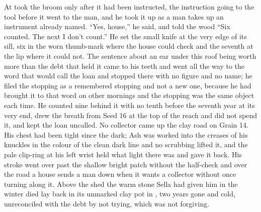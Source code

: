 At   took the broom only after it had been instructed, the instruction going to the tool before it went to the man, and he took it up as a man takes up an instrument already named. “Yes, house,” he said, and told the wood “Six counted. The next I don’t count.” He set the small knife at the very edge of its sill, six in the worn thumb-mark where the house could check and the seventh at the lip where it could not. The sentence about an ear under this roof being worth more than the debt that held it came to his teeth and went all the way to the word that would call the loan and stopped there with no figure and no name; he filed the stopping as a remembered stopping and not a new one, because he had brought it to that word on other mornings and the stopping was the same object each time. He counted nine behind it with no tenth before the seventh year at its very end, drew the breath from Seed 16 at the top of the reach and did not spend it, and kept the loan uncalled. No collector came up the clay road on Grain 14. His chest had been tight since the dark; Ash was worked into the creases of his knuckles in the colour of the clean dark line and no scrubbing lifted it, and the pale clip-ring at his left wrist held what light there was and gave it back. His stroke went over  past the shallow bright patch without the half-check and over the road a house sends a man down when it wants a collector without once turning along it. Above the shed the warm stone Sella had given him in the winter  died lay back in its unmarked clay pot in , two years gone and cold, unreconciled with the debt by not trying, which was not forgiving.

